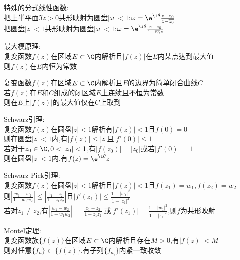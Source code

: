 \begin{dingli}
特殊的分式线性函数:\\
把上半平面$\Im z>0$共形映射为圆盘$|\omega|<1$:$\omega=\e^{\i\theta}\frac{z-z_0}{z-\overline{z_0}}$\\
把圆盘$|z|<1$共形映射为圆盘$|\omega|<1$:$\omega=\e^{\i\theta}\frac{z-z_0}{1-\overline{z_0}z}$
\end{dingli}

\begin{dingli}
最大模原理:\\
复变函数$f(z)$在区域$E\subset\C$内解析且$|f(z)|$在$E$内某点达到最大值\\
则$f(z)$在$E$内恒为常数
\end{dingli}

\begin{tuilun}
复变函数$f(z)$在区域$E\subset\C$内解析且$E$的边界为简单闭合曲线$C$\\
若$f(z)$在$E$和$C$组成的闭区域$\overline{E}$上连续且不恒为常数\\
则在$\overline{E}$上$|f(z)|$的最大值仅在$C$上取到
\end{tuilun}

\begin{dingli}
Schwarz引理:\\
复变函数$f(z)$在圆盘$|z|<1$解析有$|f(z)|<1$且$f(0)=0$\\
则在圆盘$|z|<1$内,有$|f(z)|\leq |z|$且$|f'(0)|\leq 1$\\
若对于$z_0\in\C,0<|z_0|<1$,有$|f(z_0)|=|z_0|$或若$|f'(0)|=1$\\
则在圆盘$|z|<1$内,有$f(z)=\e^{\i\theta}z$
\end{dingli}

\begin{dingli}
Schwarz-Pick引理:\\
复变函数$f(z)$在圆盘$|z|<1$解析且$|f(z)|<1$且$f(z_1)=w_1,f(z_2)=w_2$\\
则$|\frac{w_1-w_2}{1-w_1\overline{w}_2}|\leq|\frac{z_1-z_2}{1-z_1\overline{z}_2}|$且$|f'(z_1)|\leq\frac{1-|w_1|^2}{1-|z_1|^2}$\\
若对$z_1\neq z_2$,有$|\frac{w_1-w_2}{1-w_1\overline{w}_2}|=|\frac{z_1-z_2}{1-z_1\overline{z}_2}|$或$|f'(z_1)|=\frac{1-|w_1|^2}{1-|z_1|^2}$,则$f$为共形映射
\end{dingli}

\begin{dingli}
Montel定理:\\
复变函数族$\{f(z)\}$在区域$E\subset\C$内解析且存在$M>0$,有$|f(z)|<M$\\
则对任意$\{f_n\}\subset\{f(z)\}$,有子列$\{f_{n_i}\}$内紧一致收敛
\end{dingli}

